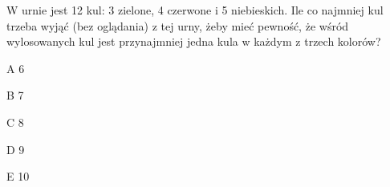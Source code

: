\begin{tresc}
W urnie jest 12 kul: 3 zielone, 4 czerwone i 5 niebieskich. Ile co najmniej kul trzeba wyjąć (bez oglądania) z tej urny, żeby mieć pewność, że wśród wylosowanych kul jest przynajmniej jedna kula w każdym z trzech kolorów?
\end{tresc}
\begin{wariant}{A} 6 \end{wariant}
\begin{wariant}{B} 7 \end{wariant}
\begin{wariant}{C} 8 \end{wariant}
\begin{wariant}{D} 9 \end{wariant}
\begin{wariant}{E} 10 \end{wariant}
